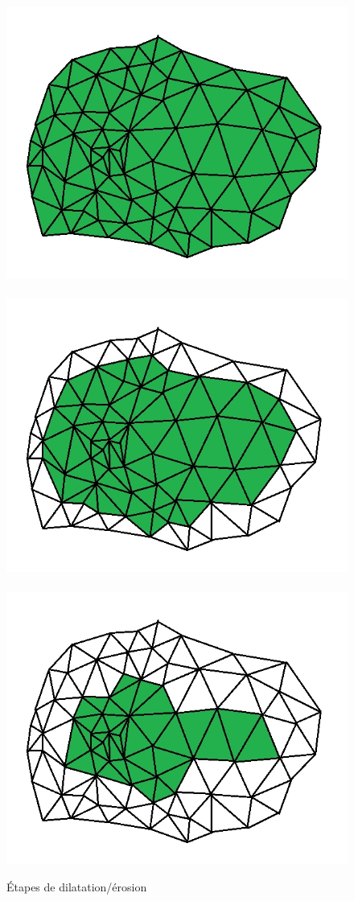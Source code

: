 \documentclass[12pt, twoside]{article}
\begin{document}
\begin{figure}[h]
\includegraphics[scale=0.3]{Dila4.jpg}~\includegraphics[scale=0.3]{Dila5.jpg}~\includegraphics[scale=0.3]{Dila6.jpg}
\caption{\label{fig:DilEro} Étapes de dilatation/érosion}
\end{figure}
\end{document}
